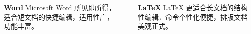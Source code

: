 \documentclass{ctexbeamer}
\begin{document}
\begin{frame}
  \begin{columns}[T]
    \begin{column}{.5\textwidth}
      \alert{\textbf{Word}}
      \stamphrule
      Microsoft\textsuperscript{\circledR{}} Word 所见即所得，适合短文档的快捷编辑，适用性广，功能丰富。
    \end{column}
    \textcolor{cprimary}{\vrule}\hfill
    \begin{column}{.5\textwidth}
      \alert{\textbf{\LaTeX{}}}
      \stamphrule
      \LaTeX{} 更适合长文档的结构性编辑，命令个性化便捷，排版文档美观正式。
    \end{column}
  \end{columns}
\end{frame}
\end{document}
